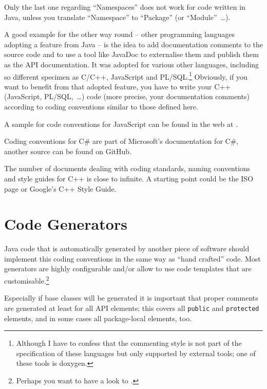 \documentclass[11pt,a4paper, titlepage, parskip=half, headsepline, footsepline, cleardoublepage=current, headheight=1cm]{scrbook}
\begin{document}
Only the last one regarding “Namespaces” does not work for code written in Java, unless you translate “Namespace” to “Package” (or “Module”~…).

A good example for the other way round – other programming languages adopting a feature from Java – is the idea to add documentation comments to the source code and to use a tool like JavaDoc to externalise them and publish them as the API documentation. It was adopted for various other languages, including so different specimen as C/C++, JavaScript and PL/SQL.\footnote{Although I have to confess that the commenting style is not part of the specification of these languages but only supported by external tools; one of these tools is doxygen\autocite{DOXYGEN_HOMEPAGE}.} Obviously, if you want to benefit from that adopted feature, you have to write your C++ (JavaScript, PL/SQL,~…) code (more precise, your documentation comments) according to coding conventions similar to those defined here.

A sample for code conventions for JavaScript can be found in the web at \autocite{Crockford:JAVASCRIPT_CODE_CONVENTIONS}.

Coding conventions for C\# are part of Microsoft's documentation for C\#\autocite{MICROSOFT:CsharpDocumentation}, another source can be found on GitHub\autocite{Taranov:CsharpCodingStandards}.

The number of documents dealing with coding standards, naming conventions and style guides for C++ is close to infinite. A starting point could be the ISO page\autocite{ISO:CppCodingStandards} or Google's C++ Style Guide\autocite{Google:CppStyleGuide}.

\section{Code Generators}
Java code that is automatically generated by another piece of software should implement this coding conventions in the same way as “hand crafted” code. Most generators are highly configurable and/or allow to use code templates that are customisable.\footnote{Perhaps you want to have a look to \autocite{TQUADRAT_ORG_FOUNDATION_JAVACOMPOSER}.}

Especially if base classes will be generated it is important that proper comments are generated at least for all API elements; this covers all \lstinline|public| and \lstinline|protected| elements, and in some cases all package-local elements, too.
\end{document}
